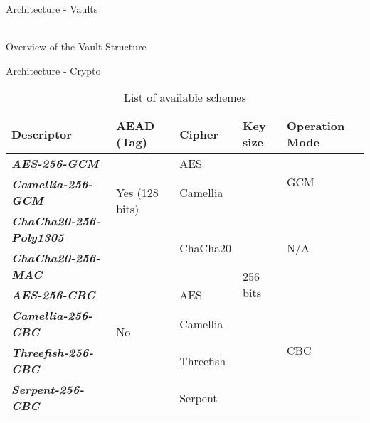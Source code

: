 \documentclass[newPxFont,noprogressbar,table]{beamer}
\begin{document}
\begin{frame}{Architecture - Vaults}

\vspace*{-2.5em}
\centering
{}\\
Overview of the Vault Structure

\end{frame}


\begin{frame}{Architecture - Crypto}

\vspace*{-2em}
\centering
\begin{table}
\caption{List of available schemes}
\scalebox{0.65}
{
\begin{tabular}{lllll}
\hline
\textbf{Descriptor}                     & \textbf{AEAD (Tag)}            & \textbf{Cipher}           & \textbf{Key size}         & \textbf{Operation Mode} \\ \hline
\textit{\textbf{\textcolor{sthlmBlue}{AES-256-GCM}}}           & \multirow{3}{*}{Yes (128 bits)} & AES                       & \multirow{8}{*}{256 bits} & \multirow{2}{*}{GCM}    \\ \cline{1-1} \cline{3-3}
\textit{\textbf{Camellia-256-GCM}}      &                                 & Camellia                  &                           &                         \\ \cline{1-1} \cline{3-3} \cline{5-5} 
\textit{\textbf{ChaCha20-256-Poly1305}} &                                 & \multirow{2}{*}{ChaCha20} &                           & \multirow{2}{*}{N/A}    \\ \cline{1-2}
\textit{\textbf{ChaCha20-256-MAC}}      & \multirow{5}{*}{No}             &                           &                           &                         \\ \cline{1-1} \cline{3-3} \cline{5-5} 
\textit{\textbf{AES-256-CBC}}           &                                 & AES                       &                           & \multirow{4}{*}{CBC}    \\ \cline{1-1} \cline{3-3}
\textit{\textbf{Camellia-256-CBC}}      &                                 & Camellia                  &                           &                         \\ \cline{1-1} \cline{3-3}
\textit{\textbf{Threefish-256-CBC}}     &                                 & Threefish                  &                           &                         \\ \cline{1-1} \cline{3-3}
\textit{\textbf{Serpent-256-CBC}}       &                                 & Serpent                   &                           &                         \\ \hline
\end{tabular}
}
\end{table}


\end{frame}
\end{document}
